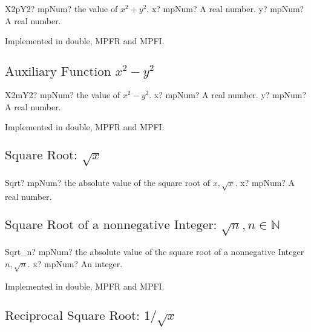 \begin{mpFunctionsExtract}
	\mpFunctionTwo
	{X2pY2? mpNum? the value of $x^2+y^2$.}
	{x? mpNum? A real number.}
	{y? mpNum? A real number.}
\end{mpFunctionsExtract}

Implemented in double, MPFR and MPFI.



\subsection{\texorpdfstring{$\text{Auxiliary Function }x^2-y^2$}{x2my2}}

\begin{mpFunctionsExtract}
	\mpFunctionTwo
	{X2mY2? mpNum? the value of $x^2-y^2$.}
	{x? mpNum? A real number.}
	{y? mpNum? A real number.}
\end{mpFunctionsExtract}

Implemented in double, MPFR and MPFI.



\subsection{\texorpdfstring{$\text{Square Root: }\sqrt{x}$}{sqrt}}

\begin{mpFunctionsExtract}
	\mpFunctionOne
	{Sqrt? mpNum? the absolute value of the square root of $x, \sqrt{x}$.}
	{x? mpNum? A real number.}
\end{mpFunctionsExtract}




\subsection{\texorpdfstring{$\text{Square Root of a nonnegative Integer: }\sqrt{n}, n \in  \mathbb{N}$}{sqrt}}

\begin{mpFunctionsExtract}
	\mpFunctionOne
	{Sqrt\_n? mpNum? the absolute value of the square root of a nonnegative Integer$n, \sqrt{n}$.}
	{x? mpNum? An integer.}
\end{mpFunctionsExtract}

Implemented in double, MPFR and MPFI.



\subsection{\texorpdfstring{$\text{Reciprocal Square Root: }1/\sqrt{x}$}{recsqrt}}

